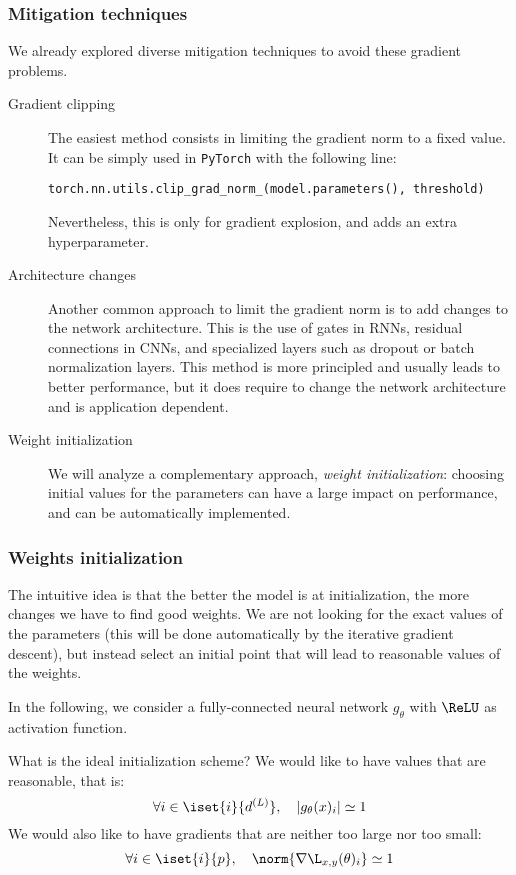 \subsubsection{Mitigation techniques}
We already explored diverse mitigation techniques to avoid these gradient problems. 

\begin{description}
    \item[Gradient clipping] The easiest method consists in limiting the gradient norm to a fixed value. It can be simply used in \texttt{PyTorch} with the following line:
    \begin{center}
        \texttt{torch.nn.utils.clip_grad_norm_(model.parameters(), threshold)}
    \end{center}
    Nevertheless, this is only for gradient explosion, and adds an extra hyperparameter.
    \item[Architecture changes] Another common approach to limit the gradient norm is to add changes to the network architecture. This is the use of gates in RNNs, residual connections in CNNs, and specialized layers such as dropout or batch normalization layers. This method is more principled and usually leads to better performance, but it does require to change the network architecture and is application dependent.
    \item[Weight initialization] We will analyze a complementary approach, \emph{weight initialization}: choosing  initial values for the parameters can have a large impact on performance, and can be automatically implemented.
\end{description}

\subsubsection{Weights initialization}
The intuitive idea is that the better the model is at initialization, the more changes we have to find good weights. We are not looking for the exact values of the parameters (this will be done automatically by the iterative gradient descent), but instead select an initial point that will lead to reasonable values of the weights.

In the following, we consider a fully-connected neural network $g_\theta$ with $\ReLU$ as activation function. 

What is the ideal initialization scheme? We would like to have values that are reasonable, that is:
\begin{equation*}
    \forall i\in\iset{i}{d^{(L)}}, \quad |g_\theta(x)_i| \simeq 1
\end{equation*}
We would also like to have gradients that are neither too large nor too small:
\begin{equation*}
    \forall i\in\iset{i}{p}, \quad \norm{\nabla\L_{x,y}(\theta)_i}\simeq 1
\end{equation*}

